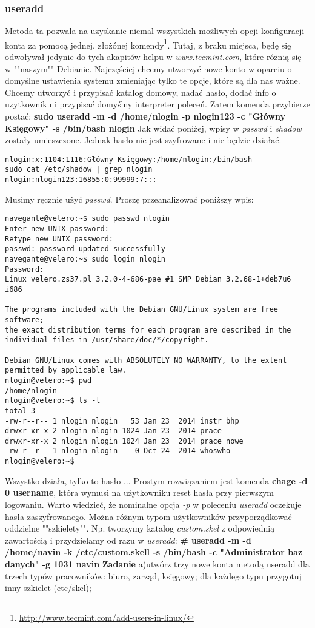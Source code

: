 \documentclass[a4paper,titlepage,12pt]{mwart}
\begin{document}
\subsubsection{useradd}
Metoda ta pozwala na uzyskanie niemal wszystkich możliwych opcji konfiguracji konta za pomocą jednej, złożónej komendy\footnote{\url{http://www.tecmint.com/add-users-in-linux/}}.
Tutaj, z braku miejsca, będę się odwoływał jedynie do tych akapitów helpu w \textit{www.tecmint.com}, które różnią się w ""naszym"" Debianie.
Najczęściej chcemy utworzyć nowe konto w oparciu o domyślne ustawienia systemu zmieniając tylko te opcje, które są dla nas ważne. Chcemy utworzyć i przypisać katalog domowy, nadać hasło, dodać info o uzytkowniku i przypisać domyślny interpreter poleceń. Zatem komenda przybierze postać:\newline
\textbf{sudo useradd -m -d /home/nlogin -p nlogin123 -c "Główny Księgowy" -s /bin/bash nlogin}
Jak widać poniżej, wpisy w \textit{passwd} i \textit{shadow} zostały umieszczone. Jednak hasło nie jest szyfrowane i nie będzie działać.
\begin{verbatim}
nlogin:x:1104:1116:Główny Księgowy:/home/nlogin:/bin/bash
sudo cat /etc/shadow | grep nlogin
nlogin:nlogin123:16855:0:99999:7:::
\end{verbatim}
Musimy ręcznie użyć \textit{passwd}. Proszę przeanalizować poniższy wpis:
\begin{verbatim}
navegante@velero:~$ sudo passwd nlogin
Enter new UNIX password: 
Retype new UNIX password: 
passwd: password updated successfully
navegante@velero:~$ sudo login nlogin
Password: 
Linux velero.zs37.pl 3.2.0-4-686-pae #1 SMP Debian 3.2.68-1+deb7u6 i686

The programs included with the Debian GNU/Linux system are free software;
the exact distribution terms for each program are described in the
individual files in /usr/share/doc/*/copyright.

Debian GNU/Linux comes with ABSOLUTELY NO WARRANTY, to the extent
permitted by applicable law.
nlogin@velero:~$ pwd
/home/nlogin
nlogin@velero:~$ ls -l
total 3
-rw-r--r-- 1 nlogin nlogin   53 Jan 23  2014 instr_bhp
drwxr-xr-x 2 nlogin nlogin 1024 Jan 23  2014 prace
drwxr-xr-x 2 nlogin nlogin 1024 Jan 23  2014 prace_nowe
-rw-r--r-- 1 nlogin nlogin    0 Oct 24  2014 whoswho
nlogin@velero:~$ 
\end{verbatim}
Wszystko działa, tylko to hasło ... Prostym rozwiązaniem jest komenda \textbf{chage -d 0 username}, która wymusi na użytkowniku reset hasła przy pierwszym logowaniu. Warto wiedzieć, że nominalne opcja \textit{-p} w poleceniu \textit{useradd} oczekuje hasła zaszyfrowanego.
Można różnym typom użytkowników przyporządkować oddzielne ""szkielety"". Np. tworzymy katalog \textit{custom.skel} z odpowiednią zawartością i przydzielamy od razu w \textit{useradd}: \textbf{# useradd -m -d /home/navin -k /etc/custom.skell -s /bin/bash -c "Administrator baz danych" -g 1031 navin}
\textbf{Zadanie}
a)utwórz trzy nowe konta metodą useradd dla trzech typów pracowników: biuro, zarząd, księgowy; dla każdego typu przygotuj inny szkielet (etc/skel);
\end{document}
